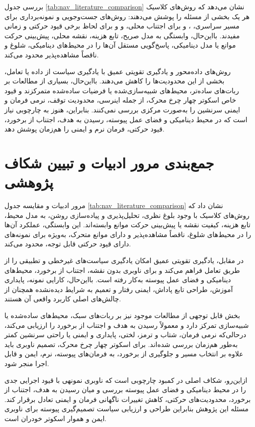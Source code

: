 بررسی جدول \ref{tab:nav_literature_comparison} نشان می‌دهد که روش‌های کلاسیک هر یک بخشی از مسئله را پوشش می‌دهند: روش‌های جست‌وجویی و نمونه‌برداری برای مسیر سراسری، ،  و  برای اجتناب محلی، و  و  برای لحاظ برخی قیود حرکتی و زمانی مفیدند. بااین‌حال، وابستگی به مدل صریح، تابع هزینه، نقشه محلی، پیش‌بینی حرکت موانع یا مدل دینامیکی، پاسخ‌گویی مستقل آن‌ها را در محیط‌های دینامیکی، شلوغ و ناقصاً مشاهده‌پذیر محدود می‌کند.

روش‌های داده‌محور و یادگیری تقویتی عمیق با یادگیری سیاست از داده یا تعامل، بخشی از این محدودیت‌ها را کاهش می‌دهند. بااین‌حال، بسیاری از مطالعات بر ربات‌های ساده‌تر، محیط‌های شبیه‌سازی‌شده یا فرضیات ساده‌شده متمرکزند و قیود خاص اسکوتر چهار چرخ محرک، از جمله اینرسی، محدودیت توقف، نرمی فرمان و ایمنی سرنشین را به‌صورت مرکزی بررسی نمی‌کنند. بنابراین، هنوز به چارچوبی نیاز است که در محیط دینامیکی و فضای عمل پیوسته، رسیدن به هدف، اجتناب از برخورد، قیود حرکتی، فرمان نرم و ایمنی را هم‌زمان پوشش دهد.

\section{جمع‌بندی مرور ادبیات و تبیین شکاف پژوهشی}

مرور ادبیات و مقایسه جدول \ref{tab:nav_literature_comparison} نشان داد که روش‌های کلاسیک با وجود بلوغ نظری، تحلیل‌پذیری و پیاده‌سازی روشن، به مدل محیط، تابع هزینه، کیفیت نقشه یا پیش‌بینی حرکت موانع وابسته‌اند. این وابستگی، عملکرد آن‌ها را در محیط‌های شلوغ، ناقصاً مشاهده‌پذیر و دارای موانع متحرک، به‌ویژه برای نمونه‌های دارای قیود حرکتی قابل توجه، محدود می‌کند.

در مقابل، یادگیری تقویتی عمیق امکان یادگیری سیاست‌های غیرخطی و تطبیقی را از طریق تعامل فراهم می‌کند و برای ناوبری بدون نقشه، اجتناب از برخورد، محیط‌های دینامیکی و فضای عمل پیوسته به‌کار رفته است. بااین‌حال، کارایی نمونه، پایداری آموزش، طراحی تابع پاداش، ایمنی رفتار و تعمیم به شرایط دیده‌نشده همچنان از چالش‌های اصلی کاربرد واقعی آن هستند.

بخش قابل توجهی از مطالعات موجود نیز بر ربات‌های سبک، محیط‌های ساده‌شده یا شبیه‌سازی تمرکز دارد و معمولاً رسیدن به هدف و اجتناب از برخورد را ارزیابی می‌کند، درحالی‌که نرمی فرمان، شتاب و ترمز، لختی، پایداری و ایمنی یا راحتی سرنشین کمتر به‌طور هم‌زمان بررسی شده‌اند. برای اسکوتر چهار چرخ محرک، تصمیم ناوبری باید علاوه بر انتخاب مسیر و جلوگیری از برخورد، به فرمان‌های پیوسته، نرم، ایمن و قابل اجرا منجر شود.

ازاین‌رو، شکاف اصلی در کمبود چارچوبی است که ناوبری نمونهی با قیود اجرایی جدی را در محیط دینامیکی و فضای عمل پیوسته بررسی و میان رسیدن به هدف، اجتناب از برخورد، محدودیت‌های حرکتی، کاهش تغییرات ناگهانی فرمان و ایمنی تعادل برقرار کند. مسئله این پژوهش بنابراین طراحی و ارزیابی سیاست تصمیم‌گیری پیوسته برای ناوبری ایمن و هموار اسکوتر خودران است.

